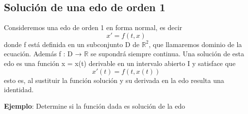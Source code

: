 \documentclass{book}
\begin{document}
    \subsection{Solución de una edo de orden 1}
    Consideremos una edo de orden 1 en forma normal, es decir
     \begin{equation*}
         x'=f(t,x)
     \end{equation*}
     donde f está definida en un subconjunto D de $\mathbb{R}^2$, que llamaremos
     dominio de la ecuación. Además f : D → $\mathbb{R}$ se supondrá siempre
    continua.
    Una solución de esta edo es una función x = x(t) derivable en un
    intervalo abierto I y satisface que
    \begin{equation*}
        x'(t)=f(t,x(t))
    \end{equation*}
    esto es, al sustituir la función solución y su derivada en la edo resulta una
    identidad.
    \newpage

     \textbf{Ejemplo}: Determine si la función dada es solución de la edo
\end{document}
